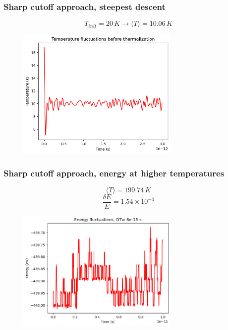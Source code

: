 \documentclass{beamer}
\begin{document}
\begin{frame}
    \frametitle{Sharp cutoff approach, steepest descent}

    $$T_{init}=20\,K \rightarrow \langle T \rangle = 10.06\,K $$

    \begin{figure}
        \includegraphics[width=0.7\textwidth]{images/tempforce.png}
    \end{figure}

\end{frame}


\begin{frame}
    \frametitle{Sharp cutoff approach, energy at higher temperatures}

    $$\langle T \rangle = 199.74\,K $$
    $$\frac{\delta E }{E}=1.54 \times 10^{-4}   $$

    \begin{figure}
        \includegraphics[width=0.7\textwidth]{images/awfulenergy.png}
    \end{figure}

\end{frame}
\end{document}
